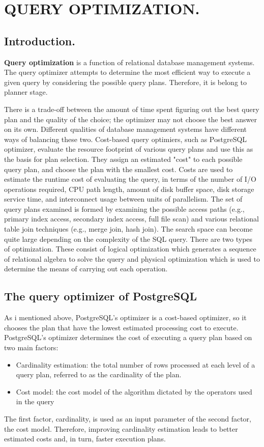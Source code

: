 \section{QUERY OPTIMIZATION.}
\subsection{Introduction.}
{\justify
{\bfseries Query optimization} is a function of relational database management systems. The query optimizer attempts to determine the most efficient way to execute a given query by considering the possible query plans. Therefore, it is belong to planner stage.
\par }
\vspace{0.5cm}
{\justify
There is a trade-off between the amount of time spent figuring out the best query plan and  the quality of the choice; the optimizer may not choose the best answer on its own. Different qualities of database management systems have different ways of balancing these two. Cost-based query optimiers, such as PostgreSQL optimizer, evaluate the resource footprint of various query plans and use this as the basis for plan selection. They assign an estimated "cost" to each possible query plan, and choose the plan with the smallest cost.  Costs are used to estimate the runtime cost of evaluating the query, in terms of the number of I/O operations required, CPU path length, amount of disk buffer space, disk storage service time, and interconnect usage between units of parallelism. The set of query plans examined is formed by examining the possible access paths (e.g., primary index access, secondary index access, full file scan) and various relational table join techniques (e.g., merge join, hash join). The search space can become quite large depending on the complexity of the SQL query. There are two types of optimization. These consist of logical optimization which generates a sequence of relational algebra to solve the query and physical optimization which is used to determine the means of carrying out each operation.
\par }
\vspace{0.5cm}
\subsection{The query optimizer of PostgreSQL}
{\justify As i mentioned above, PostgreSQL's optimizer is a cost-based optimizer, so it chooses the plan that have the lowest estimated processing cost to execute. PostgreSQL's optimizer determines the cost of executing a query plan based on two main factors: 
\begin{itemize}
\item Cardinality estimation: the total number of rows processed at each level of a query plan, referred to as the cardinality of the plan.
\item Cost model: the cost model of the algorithm dictated by the operators used in the query
\end{itemize}
The first factor, cardinality, is used as an input parameter of the second factor, the cost model. Therefore, improving cardinality estimation leads to better estimated costs and, in turn, faster execution plans.
\par }
